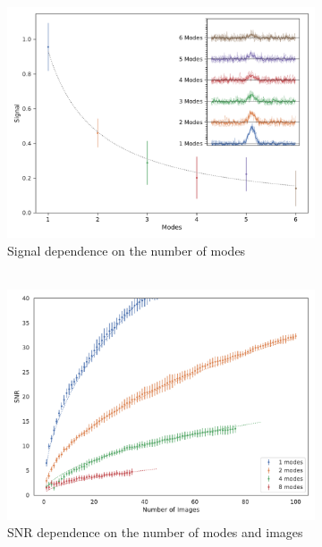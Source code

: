 \begin{figure}
	\centering
	\begin{subfigure}[b]{0.48\textwidth}
		\includegraphics[width=\linewidth]{images/modes_signal.pdf}
		\caption{Signal dependence on the number of modes\\ ${}$}
		\label{fig:modes}
	\end{subfigure}
	\begin{subfigure}[b]{0.48\textwidth}
	\includegraphics[width=\linewidth]{images/SNRNimagesgrating.pdf}
	\caption{SNR dependence on the number of modes and images}
	\label{fig:SNRNimages}
\end{subfigure}
\caption[SNR dependence on the number of modes and images]{
}
\end{figure}
